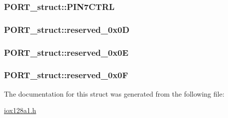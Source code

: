 \label{struct_p_o_r_t__struct_a72e0a179eabdc67f68f7585388876e7b}
\hypertarget{struct_p_o_r_t__struct_acc1d7067f87274f71edf0c648e076976}{
\subsubsection[{PIN7CTRL}]{ {\bf PORT\_\-struct::PIN7CTRL}}}
\label{struct_p_o_r_t__struct_acc1d7067f87274f71edf0c648e076976}
\hypertarget{struct_p_o_r_t__struct_a97672980f527c5fe57d0684b0e914a6c}{
\subsubsection[{reserved\_\-0x0D}]{ {\bf PORT\_\-struct::reserved\_\-0x0D}}}
\label{struct_p_o_r_t__struct_a97672980f527c5fe57d0684b0e914a6c}
\hypertarget{struct_p_o_r_t__struct_ac857af06ee2b7c11b932b0a637da0b23}{
\subsubsection[{reserved\_\-0x0E}]{ {\bf PORT\_\-struct::reserved\_\-0x0E}}}
\label{struct_p_o_r_t__struct_ac857af06ee2b7c11b932b0a637da0b23}
\hypertarget{struct_p_o_r_t__struct_a613119621a5bad8ccc13e00f3697ff63}{
\subsubsection[{reserved\_\-0x0F}]{ {\bf PORT\_\-struct::reserved\_\-0x0F}}}
\label{struct_p_o_r_t__struct_a613119621a5bad8ccc13e00f3697ff63}


The documentation for this struct was generated from the following file:\begin{DoxyCompactItemize}
\item 
\hyperlink{iox128a1_8h}{iox128a1.h}\end{DoxyCompactItemize}

